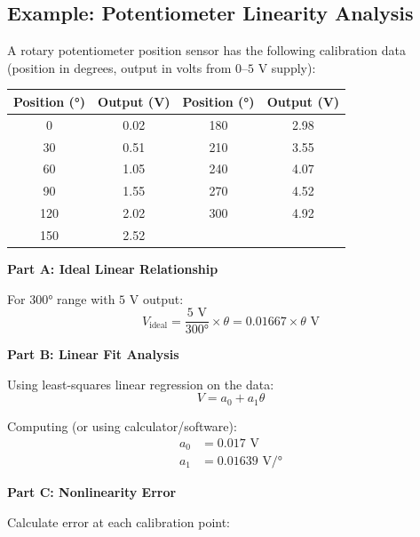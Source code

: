 \subsection{Example: Potentiometer Linearity Analysis}
\label{ex:pot_linearity}

\begin{example}

A rotary potentiometer position sensor has the following calibration data (position in degrees, output in volts from $0$--$5\text{ V}$ supply):

\begin{center}
\begin{tabular}{cc|cc}
\toprule
Position (°) & Output (V) & Position (°) & Output (V) \\
\midrule
0 & 0.02 & 180 & 2.98 \\
30 & 0.51 & 210 & 3.55 \\
60 & 1.05 & 240 & 4.07 \\
90 & 1.55 & 270 & 4.52 \\
120 & 2.02 & 300 & 4.92 \\
150 & 2.52 & & \\
\bottomrule
\end{tabular}
\end{center}

\textbf{Part A: Ideal Linear Relationship}

For $300°$ range with $5\text{ V}$ output:
\begin{equation}
V_{\text{ideal}} = \frac{5\text{ V}}{300°} \times \theta = 0.01667 \times \theta\text{ V}
\end{equation}

\textbf{Part B: Linear Fit Analysis}

Using least-squares linear regression on the data:
\begin{equation}
V = a_0 + a_1 \theta
\end{equation}

Computing (or using calculator/software):
\begin{align}
a_0 &= 0.017\text{ V} \\
a_1 &= 0.01639\text{ V/°}
\end{align}

\textbf{Part C: Nonlinearity Error}

Calculate error at each calibration point:


\end{example}

